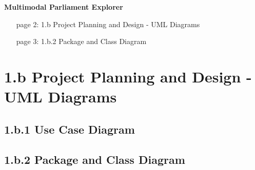 \documentclass[11pt]{article}
\author{Sophie Renate Hildegard Kaiser, Oliwia Malgorzata Daszczynska} %
\begin{document}
{\huge\textbf{Multimodal Parliament Explorer}}
\begin{itemize}
\item[page 2:] 1.b Project Planning and Design - UML Diagrams
\item[page 3:] 1.b.2 Package and Class Diagram
\end{itemize}
\eject

\section*{1.b Project Planning and Design - UML Diagrams}

\subsection*{1.b.1 Use Case Diagram}
\pdfpagewidth=45cm \pdfpageheight=45cm




\eject
\pdfpagewidth=80cm \pdfpageheight=90cm
\subsection*{1.b.2 Package and Class Diagram}

\eject
\end{document}
